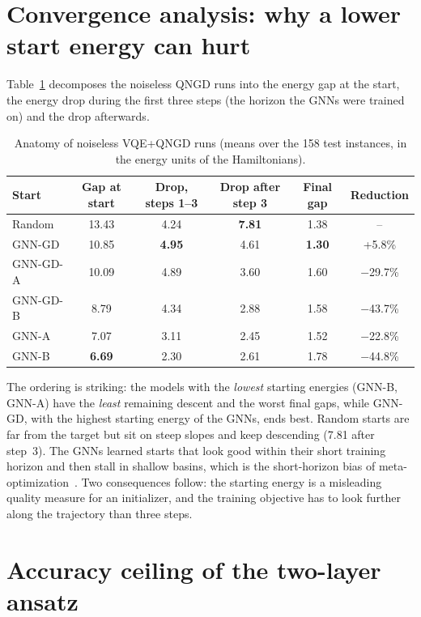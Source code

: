 \documentclass{ssnreview}
\newcommand{\Rplus}{\textcolor{green!50!black}}
\newcommand{\Rminus}{\textcolor{red!70!black}}
\begin{document}
\section{Convergence analysis: why a lower start energy can hurt}

Table~\ref{tab:anatomy} decomposes the noiseless QNGD runs into the energy gap at the start,
the energy drop during the first three steps (the horizon the GNNs were trained on) and the
drop afterwards.

\begin{table}[H]
\centering
\caption{Anatomy of noiseless VQE+QNGD runs (means over the 158 test instances, in the energy
units of the Hamiltonians).}\label{tab:anatomy}
\begin{tabular}{lccccc}
\toprule
Start & Gap at start & Drop, steps 1--3 & Drop after step 3 & Final gap & Reduction \\
\midrule
Random   & 13.43 & 4.24 & \textbf{7.81} & 1.38 & -- \\
GNN-GD   & 10.85 & \textbf{4.95} & 4.61 & \textbf{1.30} & \Rplus{+5.8\%} \\
GNN-GD-A & 10.09 & 4.89 & 3.60 & 1.60 & \Rminus{$-$29.7\%} \\
GNN-GD-B & 8.79  & 4.34 & 2.88 & 1.58 & \Rminus{$-$43.7\%} \\
GNN-A    & 7.07  & 3.11 & 2.45 & 1.52 & \Rminus{$-$22.8\%} \\
GNN-B    & \textbf{6.69} & 2.30 & 2.61 & 1.78 & \Rminus{$-$44.8\%} \\
\bottomrule
\end{tabular}
\end{table}

The ordering is striking: the models with the \emph{lowest} starting energies (GNN-B, GNN-A)
have the \emph{least} remaining descent and the worst final gaps, while GNN-GD, with the
highest starting energy of the GNNs, ends best. Random starts are far from the target but sit on
steep slopes and keep descending (7.81 after step~3). The GNNs learned starts that look good
within their short training horizon and then stall in shallow basins, which is the short-horizon
bias of meta-optimization~\cite{wu2018}. Two consequences follow: the starting energy is a
misleading quality measure for an initializer, and the training objective has to look further
along the trajectory than three steps.

\section{Accuracy ceiling of the two-layer ansatz}\label{sec:ceiling}
\end{document}
